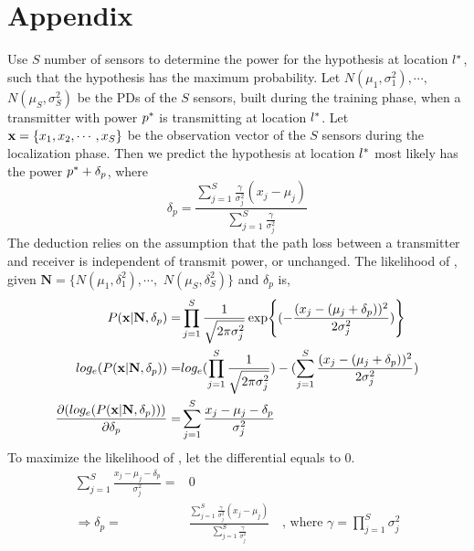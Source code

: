 \section*{\textbf{Appendix}}

\label{appen:ipsn}

Use $S$ number of sensors to determine the power for the hypothesis at location $l^*$, such that the hypothesis has the maximum probability.
Let $N(\mu_1, \sigma_1^2), \cdots, $ $N(\mu_S, \sigma_S^2)$ be the PDs of the $S$ sensors, built during the training phase, when a transmitter with power $p^*$ is transmitting at location $l^*$. 
Let $\mathbf{x} = \{x_1, x_2, \cdots, x_S\}$ be the observation vector of the $S$ sensors during the localization phase. 
Then we predict the hypothesis at location $l^*$ most likely has the power $p^* + \delta_p$, where 
$$\delta_p = \frac{\sum_{j=1}^{S} \frac{\gamma}{\sigma_j^2} (x_j - \mu_j)}{\sum_{j=1}^{S} \frac{\gamma}{\sigma_j^2}}$$
The deduction relies on the assumption that the path loss between a transmitter and receiver is independent of transmit power, or unchanged. The likelihood of \vx, given  $ \mathbf{N} = \{ N(\mu_1, \delta_1^2), \cdots, $ $N(\mu_S, \delta_S^2) \} $ and $\delta_p$ is,
\begin{align*}
P(\mathbf{x} | \mathbf{N}, \delta_p)        = & \prod_{j=1}^{S} \frac{1}{\sqrt{2\pi\sigma_j^2}} \exp{(- \frac{(x_j - (\mu_j + \delta_p))^2}{2\sigma_j^2})} \\
log_e(P(\mathbf{x} | \mathbf{N}, \delta_p)) = & log_e(\prod_{j=1}^{S}\frac{1}{\sqrt{2\pi\sigma_j^2}}) - (\sum_{j=1}^{S} \frac{(x_j - (\mu_j + \delta_p))^2}{2\sigma_j^2})  \\
\frac{\partial (log_e(P(\mathbf{x} | \mathbf{N}, \delta_p))) }{\partial \delta_p} = & \sum_{j=1}^{S} \frac{x_j - \mu_j - \delta_p}{\sigma_j^2}
\end{align*}
To maximize the likelihood of \vx, let the differential equals to 0.
\begin{align*}
\sum_{j=1}^{S} \frac{x_j - \mu_j - \delta_p}{\sigma_j^2} = & 0 \\
\Rightarrow \delta_p= & \frac{\sum_{j=1}^{S} \frac{\gamma}{\sigma_j^2} (x_j - \mu_j)}{\sum_{j=1}^{S} \frac{\gamma}{\sigma_j^2}}  \ \ \ \text{ , where } \gamma = \prod_{j=1}^{S}\sigma_j^2 \\
\end{align*}
